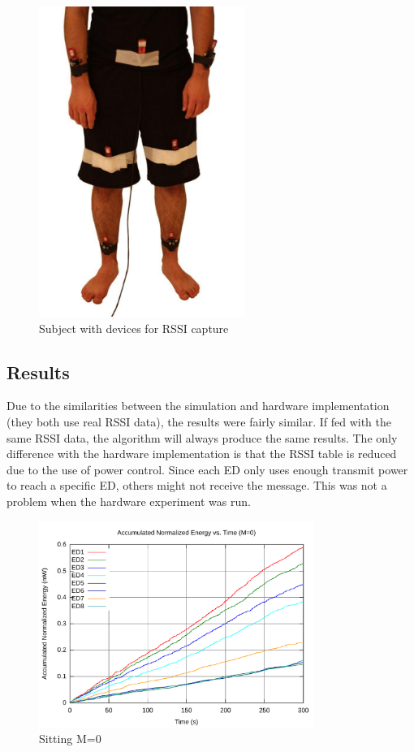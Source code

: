 \documentclass{article}
\begin{document}
\begin{figure}[!htb]
\begin{center}
\includegraphics[width=0.6\textwidth]{figures/halfbody.pdf}
\end{center}
\caption{Subject with devices for RSSI capture}
\label{fig:halfbody}
\end{figure}


\subsection{Results}

Due to the similarities between the simulation and hardware implementation (they both use real RSSI data), the results were fairly similar. If fed with the same RSSI data, the algorithm will always produce the same results. The only difference with the hardware implementation is that the RSSI table is reduced due to the use of power control. Since each ED only uses enough transmit power to reach a specific ED, others might not receive the message. This was not a problem when the hardware experiment was run.

\begin{figure}[!ht]
\includegraphics[width=0.8\textwidth]{figures/sit1-c0.pdf}
\caption{Sitting M=0}
\label{fig:sit1-c0}
\end{figure}
\end{document}
